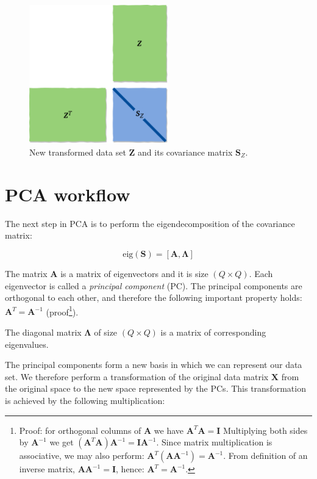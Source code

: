 \documentclass[10pt,twocolumn]{article}
\begin{document}
\begin{figure}[H]
\centering\includegraphics[width=6cm]{PC-scores.png}
\caption{New transformed data set $\bm{Z}$ and its covariance matrix $\bm{S}_Z$.}
\label{fig:PC-scores}
\end{figure}

\section{PCA workflow}

The next step in PCA is to perform the eigendecomposition of the covariance matrix:

\begin{equation} \label{eq:eig-dec}
\text{eig}(\bm{S}) = [\bm{A}, \bm{\Lambda}]
\end{equation}

The matrix $\bm{A}$ is a matrix of eigenvectors and it is size $(Q \times Q)$. Each eigenvector is called a \textit{principal component} (PC). The principal components are orthogonal to each other, and therefore the following important property holds: $\bm{A}^T = \bm{A}^{-1}$ (proof\footnote{Proof: for orthogonal columns of $\bm{A}$ we have $\bm{A}^T \bm{A} = \bm{I}$ Multiplying both sides by $\bm{A}^{-1}$ we get $(\bm{A}^T \bm{A}) \bm{A}^{-1}= \bm{I}\bm{A}^{-1}$. Since matrix multiplication is associative, we may also perform: $\bm{A}^T (\bm{A} \bm{A}^{-1}) = \bm{A}^{-1}$. From definition of an inverse matrix,  $\bm{A} \bm{A}^{-1} = \bm{I}$, hence: $\bm{A}^T = \bm{A}^{-1}$.}).

The diagonal matrix $\bm{\Lambda}$ of size $(Q \times Q)$ is a matrix of corresponding eigenvalues.

The principal components form a new basis in which we can represent our data set. We therefore perform a transformation of the original data matrix $\bm{X}$ from the original space to the new space represented by the PCs. This transformation is achieved by the following multiplication:
\end{document}

